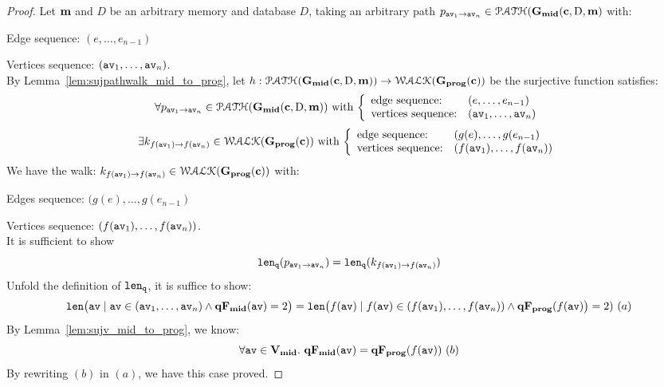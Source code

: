 \begin{proof}
%
Let ${\boldsymbol{\mathbf{m}}}$ and $D$ be an arbitrary memory and database $D$,
taking an arbitrary path $p_{\mathtt{av}_1 \to \mathtt{av}_n} \in \mathcal{PATH}(\mathtt{\bf{G_{mid}}}({\boldsymbol{\mathbf{c}}}, \text{D}, {\boldsymbol{\mathbf{m}}})$ with:
%
\item Edge sequence: $(e, \ldots, e_{n-1})$
%
\item Vertices sequence: $(\mathtt{av}_1, \ldots, \mathtt{av}_n)$.
\\
By Lemma~\ref{lem:sujpathwalk_mid_to_prog}, let $h: \mathcal{PATH}(\mathtt{\bf{G_{mid}}}({\boldsymbol{\mathbf{c}}}, \text{D}, {\boldsymbol{\mathbf{m}}})) \to \mathcal{WALK}(\mathtt{\bf{G_{prog}}}({\boldsymbol{\mathbf{c}}}))$ be the surjective function satisfies:
%
\[
  \forall p_{\av_1 \to \av_n} \in \paths(\midG(\ssa{c}, \text{D}, \ssa{m}))
  \text{ with }
  \left\{
  \begin{array}{ll}
  \mbox{edge sequence:} & (e, \ldots, e_{n-1})
  \\ 
  \mbox{vertices sequence:} & (\av_1, \ldots, \av_n)
  \end{array}
  \right.
\]
%
\[
  \exists k_{f(\av_1) \to f(\av_n)} \in \walks(\progG(\ssa{c}))
  \text{ with }
  \left\{
  \begin{array}{ll}
  \mbox{edge sequence:} & (g(e), \ldots, g(e_{n-1}) 
  \\ 
  \mbox{vertices sequence:} & (f(\av_1), \ldots, f(\av_{n}))
  \end{array}
  \right.
\]
%
We have the walk:
$k_{f(\mathtt{av}_1) \to f(\mathtt{av}_n)} \in \mathcal{WALK}(\mathtt{\bf{G_{prog}}}({\boldsymbol{\mathbf{c}}}))$ with:
%
\item Edges sequence: $(g(e), \ldots, g(e_{n-1}) $
%
\item Vertices sequence: $(f(\mathtt{av}_1), \ldots, f(\mathtt{av}_{n}))$.
\\
It is sufficient to show 
%
\[
  \mathtt{len}_{\tt q}(p_{\mathtt{av}_1 \to \mathtt{av}_n}) = \mathtt{len}_{\tt q}(k_{f(\mathtt{av}_1) \to f(\mathtt{av}_n)})
\]
%
Unfold the definition of $\mathtt{len}_{\tt q}$, it is suffice to show:
\[
\mathtt{len} \big( \mathtt{av} \mid \mathtt{av} \in (\mathtt{av}_1, \ldots, \mathtt{av}_n) \land \mathtt{\bf{qF_{mid}}}(\mathtt{av}) = 2 \big) 
= \mathtt{len} \big(f(\mathtt{av}) \mid f(\mathtt{av}) \in (f(\mathtt{av}_1), \ldots, f(\mathtt{av}_{n})) \land \mathtt{\bf{qF_{prog}}}(f(\mathtt{av})\big) = 2) 
~ (a)
\]
%
By Lemma~\ref{lem:sujv_mid_to_prog}, we know:
%
\[
  \forall \mathtt{av} \in \mathtt{\bf{V_{mid}}}. ~ \mathtt{\bf{qF_{mid}}}(\mathtt{av}) = \mathtt{\bf{qF_{prog}}}(f(\mathtt{av})) ~(b)
\]
By rewriting $(b)$ in $(a)$, we have this case proved.

\end{proof}